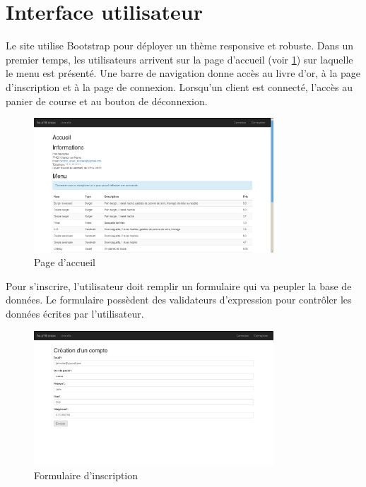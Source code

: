 \section{Interface utilisateur}

Le site utilise Bootstrap pour déployer un thème responsive et robuste.
Dans un premier temps, les utilisateurs arrivent sur la page d'accueil (voir
\ref{fig:index}) sur laquelle le menu est présenté. Une barre de navigation
donne accès au livre d'or, à la page d'inscription et à la page de connexion.
Lorsqu'un client est connecté, l'accès au panier de course et au bouton de
déconnexion.

\begin{figure}[H]
	\centering
	\includegraphics[width=0.8\textwidth]{res/index.png}
	\caption{Page d'accueil}
	\label{fig:index}
\end{figure}

Pour s'inscrire, l'utilisateur doit remplir un formulaire qui va peupler la
base de données. Le formulaire possèdent des validateurs d'expression pour
contrôler les données écrites par l'utilisateur.

\begin{figure}[H]
	\centering
	\includegraphics[width=0.8\textwidth]{res/formulaire_inscription.png}
	\caption{Formulaire d'inscription}
	\label{fig:signup}
\end{figure}

